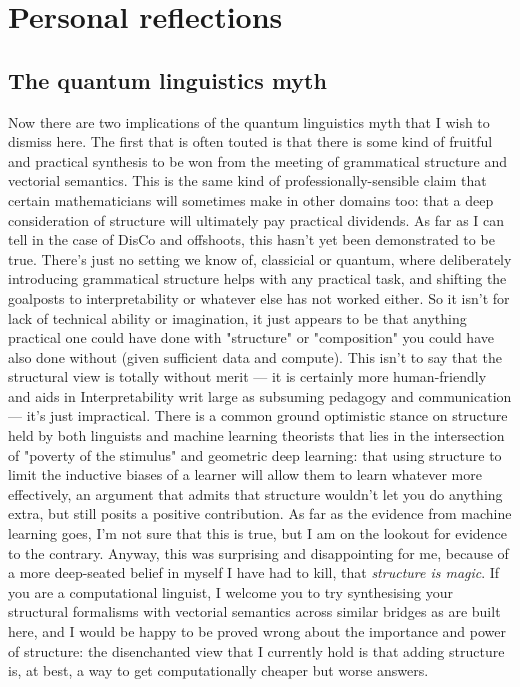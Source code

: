 \section{Personal reflections}

\subsection{The quantum linguistics myth}
Now there are two implications of the quantum linguistics myth that I wish to dismiss here. The first that is often touted is that there is some kind of fruitful and practical synthesis to be won from the meeting of grammatical structure and vectorial semantics. This is the same kind of professionally-sensible claim that certain mathematicians will sometimes make in other domains too: that a deep consideration of structure will ultimately pay practical dividends. As far as I can tell in the case of DisCo and offshoots, this hasn't yet been demonstrated to be true. There's just no setting we know of, classicial or quantum, where deliberately introducing grammatical structure helps with any practical task, and shifting the goalposts to interpretability or whatever else has not worked either. So it isn't for lack of technical ability or imagination, it just appears to be that anything practical one could have done with "structure" or "composition" you could have also done without (given sufficient data and compute). This isn't to say that the structural view is totally without merit --- it is certainly more human-friendly and aids in Interpretability writ large as subsuming pedagogy and communication --- it's just impractical. There is a common ground optimistic stance on structure held by both linguists and machine learning theorists that lies in the intersection of "poverty of the stimulus" and geometric deep learning: that using structure to limit the inductive biases of a learner will allow them to learn whatever more effectively, an argument that admits that structure wouldn't let you do anything extra, but still posits a positive contribution. As far as the evidence from machine learning goes, I'm not sure that this is true, but I am on the lookout for evidence to the contrary. Anyway, this was surprising and disappointing for me, because of a more deep-seated belief in myself I have had to kill, that \emph{structure is magic}. If you are a computational linguist, I welcome you to try synthesising your structural formalisms with vectorial semantics across similar bridges as are built here, and I would be happy to be proved wrong about the importance and power of structure: the disenchanted view that I currently hold is that adding structure is, at best, a way to get computationally cheaper but worse answers.\\

